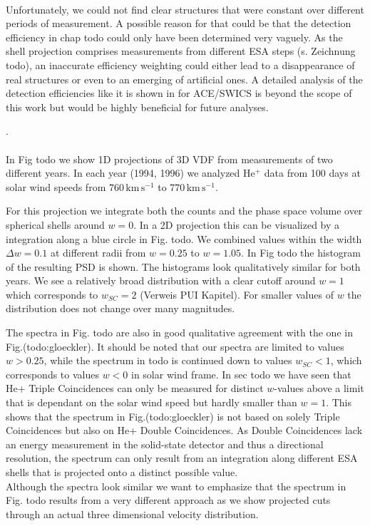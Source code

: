 \\
Unfortunately, we could not find clear structures that were constant over different periods of measurement. A possible reason for that could be that the detection efficiency in chap todo could only have been determined very vaguely. As the shell projection comprises measurements from different ESA steps (s. Zeichnung todo), an inaccurate efficiency weighting could either lead to a disappearance of real structures or even to an emerging of artificial ones. A detailed analysis of the detection efficiencies like it is shown in \citet{koeten} for ACE/SWICS is beyond the scope of this work but would be highly beneficial for future analyses.


.
\\ \\
In Fig todo we show 1D projections of 3D VDF from measurements of two different years. In each year (1994, 1996) we analyzed $\mathrm{He^{+}}$ data from 100 days at solar wind speeds from $760 \, \mathrm{km\,s^{-1}}$ to $770 \, \mathrm{km\,s^{-1}}$. 

For this projection we integrate both the counts and the phase space volume over spherical shells around $w=0$. In a 2D projection this can be visualized by a integration along a blue circle in Fig. todo. We combined values within the width $\Delta w = 0.1$ at different radii from $w = 0.25$ to $w = 1.05$. In Fig todo the histogram of the resulting PSD is shown.
The histograms look qualitatively similar for both years. 
We see a relatively broad distribution with a clear cutoff around $w = 1$ which corresponds to $w_{SC} = 2$ (Verweis PUI Kapitel). For smaller values of $w$ the distribution does not change over many magnitudes. 


The spectra in Fig. todo are also in good qualitative agreement with the one in Fig.(todo:gloeckler). It should be noted that our spectra are limited to values $w > 0.25$, while the spectrum in todo is continued down to values $w_{SC} < 1$, which corresponds to values $w < 0$ in solar wind frame. 
In sec todo we have seen that He+ Triple Coincidences can only be measured for distinct $w$-values above a limit that is dependant on the solar wind speed but hardly smaller than $w = 1$. This shows that the spectrum in Fig.(todo:gloeckler) is not based on solely Triple Coincidences but also on He+ Double Coincidences. As Double Coincidences lack an energy measurement in the solid-state detector and thus a directional resolution, the spectrum can only result from an integration along different ESA shells that is projected onto a distinct possible value.
\\
Although the spectra look similar we want to emphasize that the spectrum in Fig. todo results from a very different approach as we show projected cuts through an actual three dimensional velocity distribution.


